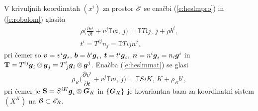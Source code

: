V krivuljnih koordinatah $(x^i)$ za prostor $\mathscr E$ se enačbi (\ref{e:heslmpro}) in (\ref{e:robolom}) glasita
\begin{gather*}
	\rho\Big(\frac{\partial v^i}{\partial t}+v^j\topbot{v}{i}{,\, j}\Big)=\topbot{T}{ij}{,\, j}+\rho b^i,\\
	t^i=T^{ij}n_j=\topbot{T}{i}{j}n^j,
\end{gather*}
pri čemer so $\boldsymbol v=v^i\boldsymbol g_i$, $\boldsymbol b=b^i\boldsymbol g_i$, $\boldsymbol t=t^i\boldsymbol g_i$,
$\boldsymbol n=n^i\boldsymbol g_i=n_i\boldsymbol g^i$ in $\ten{T}=T^{ij}\vek{g}_i\otimes\vek{g}_j=\topbot{T}{i}{j}\vek{g}_i\otimes\vek{g}^j$.
Enačba (\ref{e:heslmmat}) se glasi
\begin{equation*}
	\rho_R\Big(\frac{\partial v^i}{\partial t}+v^j\topbot{v}{i}{,\, j}\Big)=\topbot{S}{iK}{,\, K}+\rho_R b^i,
\end{equation*}
pri čemer je $\mathbf S=S^{iK}\boldsymbol g_i\otimes\boldsymbol G_K$
in $\{\boldsymbol G_K\}$ je kovariantna baza za koordinatni sistem $(X^K)$ na $\mathcal B\subset\mathscr E_R$.
